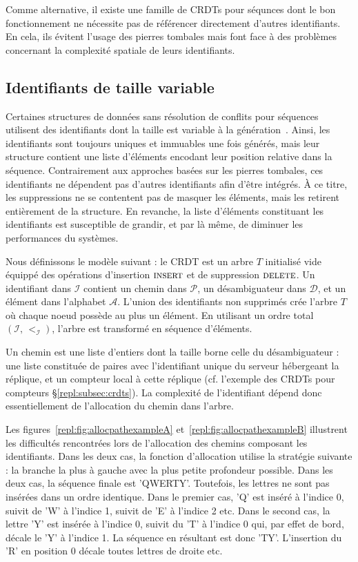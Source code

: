 Comme alternative, il existe une famille de CRDTs pour séqunces dont le bon
fonctionnement ne nécessite pas de référencer directement d'autres
identifiants. En cela, ils évitent l'usage des pierres tombales mais font face à
des problèmes concernant la complexité spatiale de leurs identifiants.

\subsection{Identifiants de taille variable}
\label{repl:subsec:variable}

Certaines structures de données sans résolution de conflits pour séquences
utilisent des identifiants dont la taille est variable à la
génération~\cite{andre2013supporting, preguica2009commutative,
  weiss2009logoot}. Ainsi, les identifiants sont toujours uniques et immuables
une fois générés, mais leur structure contient une liste d'éléments encodant
leur position relative dans la séquence.  Contrairement aux approches basées sur
les pierres tombales, ces identifiants ne dépendent pas d'autres identifiants
afin d'être intégrés. À ce titre, les suppressions ne se contentent pas de
masquer les éléments, mais les retirent entièrement de la structure. En
revanche, la liste d'éléments constituant les identifiants est susceptible de
grandir, et par là même, de diminuer les performances du systèmes.

Nous définissons le modèle suivant : le CRDT est un arbre $T$ initialisé vide
équippé des opérations d'insertion $\textsc{insert}$ et de suppression
$\textsc{delete}$. Un identifiant dans $\mathcal{I}$ contient un chemin dans
$\mathcal{P}$, un désambiguateur dans $\mathcal{D}$, et un élément dans
l'alphabet $\mathcal{A}$. L'union des identifiants non supprimés crée l'arbre
$T$ où chaque noeud possède au plus un élément.  En utilisant un ordre total
$(\mathcal{I},\, <_\mathcal{I})$, l'arbre est transformé en séquence d'éléments.

Un chemin est une liste d'entiers dont la taille borne celle du désambiguateur :
une liste constituée de paires avec l'identifiant unique du serveur hébergeant
la réplique, et un compteur local à cette réplique (cf. l'exemple des CRDTs pour
compteurs §\ref{repl:subsec:crdts}). La complexité de l'identifiant dépend donc
essentiellement de l'allocation du chemin dans l'arbre.

Les figures~\ref{repl:fig:allocpathexampleA} et~\ref{repl:fig:allocpathexampleB}
illustrent les difficultés rencontrées lors de l'allocation des chemins
composant les identifiants. Dans les deux cas, la fonction d'allocation utilise
la stratégie suivante : la branche la plus à gauche avec la plus petite
profondeur possible. Dans les deux cas, la séquence finale est
'QWERTY'. Toutefois, les lettres ne sont pas insérées dans un ordre
identique. Dans le premier cas, 'Q' est inséré à l'indice 0, suivit de 'W' à
l'indice 1, suivit de 'E' à l'indice 2 etc.  Dans le second cas, la lettre 'Y'
est insérée à l'indice 0, suivit du 'T' à l'indice 0 qui, par effet de bord,
décale le 'Y' à l'indice 1. La séquence en résultant est donc 'TY'. L'insertion
du 'R' en position 0 décale toutes lettres de droite etc.


